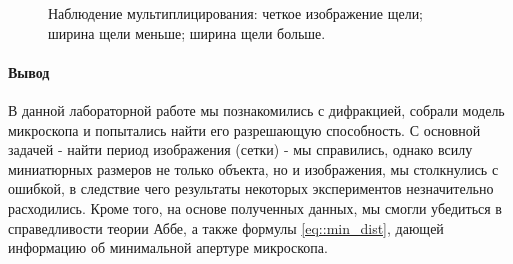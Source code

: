 \documentclass[12pt]{article}
\begin{document}
	\begin{figure} 
		\vspace{-4ex} \centering {}  
		\hspace{4ex}
		\hspace{4ex}
		\caption{Наблюдение мультиплицирования:  четкое изображение щели;  ширина щели меньше;  ширина щели больше.} \label{fig:multi}
	\end{figure}
	
	\paragraph{Вывод}
	В данной лабораторной работе мы познакомились с дифракцией, собрали модель микроскопа и попытались найти его разрешающую способность. С основной задачей - найти период изображения (сетки) - мы справились, однако всилу миниатюрных размеров не только объекта, но и изображения, мы столкнулись с ошибкой, в следствие чего результаты некоторых экспериментов незначительно расходились. Кроме того, на основе полученных данных, мы смогли убедиться в справедливости теории Аббе, а также формулы \eqref{eq::min_dist}, дающей информацию об минимальной апертуре микроскопа.
	
\end{document}
